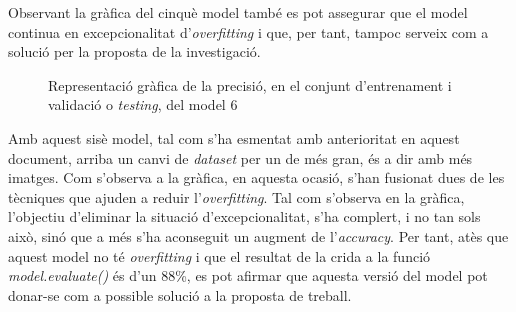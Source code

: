 \documentclass[a4paper,12pt]{article}
\begin{document}
Observant la gràfica del cinquè model també es pot assegurar que el model continua en excepcionalitat d'\textit{overfitting} i que, per tant, tampoc serveix com a solució per la proposta de la investigació.
\begin{figure}[H]
    \centering
    \caption{Representació gràfica de la precisió, en el conjunt d'entrenament i validació o \textit{testing}, del model 6}
    \label{fig:model6}
\end{figure}
Amb aquest sisè model, tal com s'ha esmentat amb anterioritat en aquest document, arriba un canvi de \textit{dataset} per un de més gran, és a dir amb més imatges. Com s'observa a la gràfica, en aquesta ocasió, s'han fusionat dues de les tècniques que ajuden a reduir l'\textit{overfitting}. Tal com s'observa en la gràfica, l'objectiu d'eliminar la situació d'excepcionalitat, s'ha complert, i no tan sols això, sinó que a més s'ha aconseguit un augment de l'\textit{accuracy}. Per tant, atès que aquest model no té \textit{overfitting} i que el resultat de la crida a la funció \textit{model.evaluate()} és d'un 88\%, es pot afirmar que aquesta versió del model pot donar-se com a possible solució a la proposta de treball.
\end{document}
